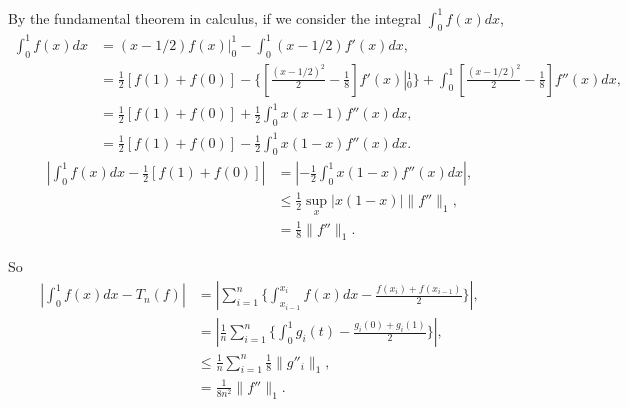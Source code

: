\documentclass[12pt]{article}
\begin{document}
%
%
%
By the fundamental theorem in calculus, if we consider the integral $\int_{0}^{1}f(x)dx$,
\begin{align*}
  \int_{0}^{1}f(x)dx&=(x-1/2)f(x)\left|\right._{0}^{1}-\int_{0}^{1}(x-1/2)f'(x)dx,\\
  &=\frac{1}{2}[f(1)+f(0)]-\{[\frac{(x-1/2)^2}{2}-\frac{1}{8}]f'(x)\left|_{0}^{1}\right.\}+\int_{0}^{1}[\frac{(x-1/2)^2}{2}-\frac{1}{8}]f''(x)dx,\\
  &=\frac{1}{2}[f(1)+f(0)]+\frac{1}{2}\int_{0}^{1}x(x-1)f''(x)dx,\\
  &=\frac{1}{2}[f(1)+f(0)]-\frac{1}{2}\int_{0}^{1}x(1-x)f''(x)dx.
\end{align*}
\begin{align*}
  |\int_{0}^{1}f(x)dx-\frac{1}{2}[f(1)+f(0)]|&=|-\frac{1}{2}\int_{0}^{1}x(1-x)f''(x)dx|,\\
  &\leq\frac{1}{2}\sup_x|x(1-x)|\|f''\|_1,\\
  &=\frac{1}{8}\|f''\|_1.
\end{align*}

So
\begin{align*}
  \left|\int_{0}^{1}f(x)dx-T_n(f)\right|&=\left|\sum_{i=1}^{n}\{\int_{x_{i-1}}^{x_i}f(x)dx-\frac{f(x_i)+f(x_{i-1})}{2}\}\right|,\\
  &=\left|\frac{1}{n}\sum_{i=1}^{n}\{\int_{0}^{1}g_i(t)-\frac{g_i(0)+g_i(1)}{2}\}\right|,\\
  &\leq\frac{1}{n}\sum_{i=1}^{n}\frac{1}{8}\|g''_i\|_1,\\
  &=\frac{1}{8n^2}\|f''\|_1.
\end{align*}
\end{document}
